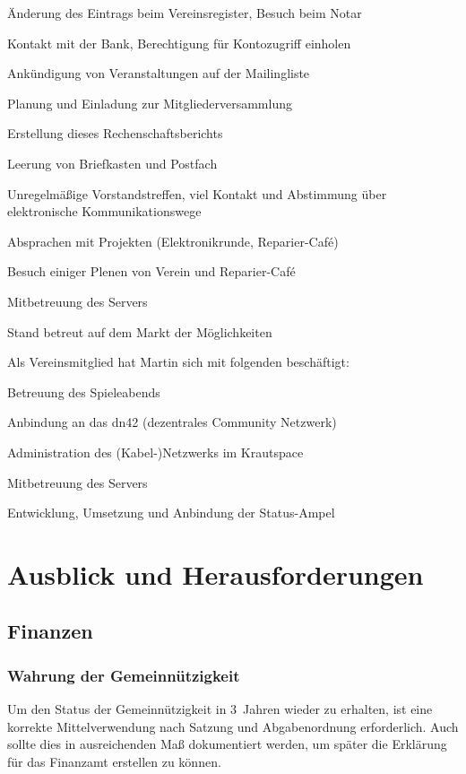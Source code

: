 \documentclass[ngerman]{scrartcl}
\begin{document}
\begin{compactitem}
\begin{compactitem}
	\end{compactitem}
	\item Änderung des Eintrags beim Vereinsregister, Besuch beim Notar
	\item Kontakt mit der Bank, Berechtigung für Kontozugriff einholen
	\item Ankündigung von Veranstaltungen auf der Mailingliste
	\item Planung und Einladung zur Mitgliederversammlung
	\item Erstellung dieses Rechenschaftsberichts
	\item Leerung von Briefkasten und Postfach
	\item Unregelmäßige Vorstandstreffen, viel Kontakt und Abstimmung über elektronische Kommunikationswege
	\item Absprachen mit Projekten (Elektronikrunde, Reparier-Café)
	\item Besuch einiger Plenen von Verein und Reparier-Café
	\item Mitbetreuung des Servers
	\item Stand betreut auf dem Markt der Möglichkeiten
\end{compactitem}

Als Vereinsmitglied hat Martin sich mit folgenden beschäftigt: 
\begin{compactitem}
	\item Betreuung des Spieleabends
	\item Anbindung an das dn42 (dezentrales Community Netzwerk)
	\item Administration des (Kabel-)Netzwerks im Krautspace
	\item Mitbetreuung des Servers
	\item Entwicklung, Umsetzung und Anbindung der Status-Ampel
\end{compactitem}

\section{Ausblick und Herausforderungen}

\subsection{Finanzen}
\label{sec:ausblick:finanzen}

\subsubsection{Wahrung der Gemeinnützigkeit}
Um den Status der Gemeinnützigkeit in 3~Jahren wieder zu erhalten, ist eine korrekte Mittelverwendung nach Satzung und Abgabenordnung erforderlich.
Auch sollte dies in ausreichenden Maß dokumentiert werden, um später die Erklärung für das Finanzamt erstellen zu können.
\end{document}
